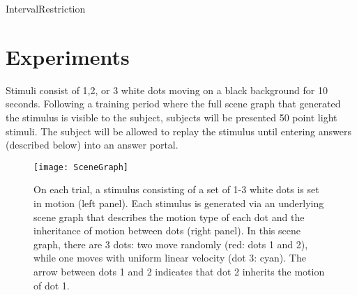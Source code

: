 \documentclass{scrartcl}
\begin{document}
    

        
  
  



\begin{algorithm}
\DontPrintSemicolon
{} 
\caption{IntervalRestriction\label{IR}}
\end{algorithm}  





\section{Experiments}

Stimuli consist of 1,2, or 3 white dots moving on a black background for 10 seconds. Following a training period where the full scene graph that generated the stimulus is visible to the subject, subjects will be presented 50 point light stimuli. The subject will be allowed to replay the stimulus until entering answers (described below) into an answer portal. 

\begin{figure}[h]
    \centering
    \texttt{[image: SceneGraph]}
    \caption{On each trial, a stimulus consisting of a set of 1-3 white dots is set in motion (left panel). Each stimulus is generated via an underlying scene graph that describes the motion type of each dot and the inheritance of motion between dots (right panel). In this scene graph, there are 3 dots: two move randomly (red: dots 1 and 2), while one moves with uniform linear velocity (dot 3: cyan). The arrow between dots 1 and 2 indicates that dot 2 inherits the motion of dot 1.}
    \label{fig:scenegraph}
\end{figure}
\end{document}
